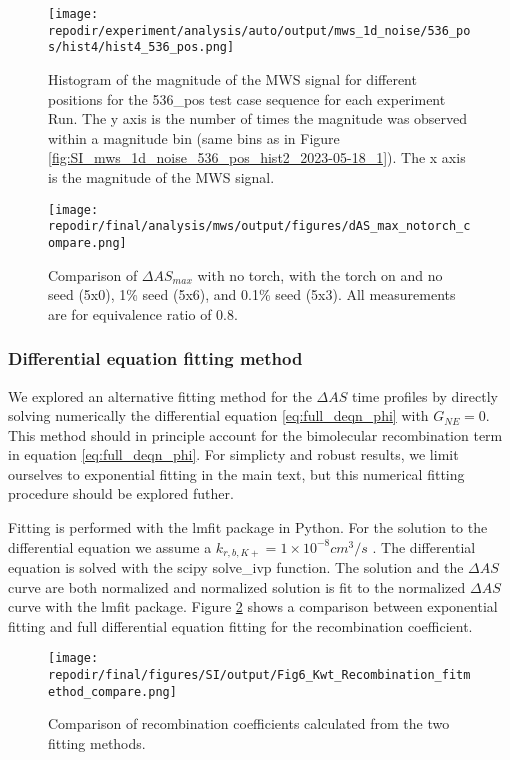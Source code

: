 \begin{figure}
    \centering
    \texttt{[image: \\repodir/experiment/analysis/auto/output/mws\_1d\_noise/536\_pos/hist4/hist4\_536\_pos.png]} 
    \caption{Histogram of the magnitude of the MWS signal for different positions for the 536\_pos test case sequence for each experiment Run. The y axis is the number of times the magnitude was observed within a magnitude bin (same bins as in Figure \ref{fig:SI_mws_1d_noise_536_pos_hist2_2023-05-18_1}). The x axis is the magnitude of the MWS signal.}
    \label{fig:SI_mws_1d_noise_536_pos_hist4_hist4_536_pos}
\end{figure}

\begin{figure}[]
\centering
\texttt{[image: \\repodir/final/analysis/mws/output/figures/dAS\_max\_notorch\_compare.png]}
\caption{Comparison of $\Delta AS_{max}$ with no torch, with the torch on and no seed (5x0), 1\% seed (5x6), and 0.1\% seed (5x3).  All measurements are for equivalence ratio of 0.8.}
\end{figure}

\label{sec:mws-diff-eq-fitting}
\subsubsection{Differential equation fitting method }

We explored an alternative fitting method for the $\Delta AS$ time profiles by directly solving numerically the differential equation \ref{eq:full_deqn_phi} with $G_{NE} =0$. This method should in principle account for the bimolecular recombination term in equation \ref{eq:full_deqn_phi}. For simplicty and robust results, we limit ourselves to exponential fitting in the main text, but this numerical fitting procedure should be explored futher. 

Fitting is performed with the lmfit package in Python. For the solution to the differential equation we assume a $k_{r,b,K+} = 1 \times 10^{-8} cm^3/s$ . The differential equation is solved with the scipy solve\_ivp function. The solution and the $\Delta AS$ curve are both normalized and normalized solution is fit to the normalized $\Delta AS$ curve with the lmfit package. Figure \ref{fig:SI_Kwt_Recombination_fitmethod_compare} shows a comparison between exponential fitting and full differential equation fitting for the recombination coefficient. 

\begin{figure}[]
\centering
\texttt{[image: \\repodir/final/figures/SI/output/Fig6\_Kwt\_Recombination\_fitmethod\_compare.png]}
\caption{Comparison of recombination coefficients calculated from the two fitting methods.}
\label{fig:SI_Kwt_Recombination_fitmethod_compare}
\end{figure}

